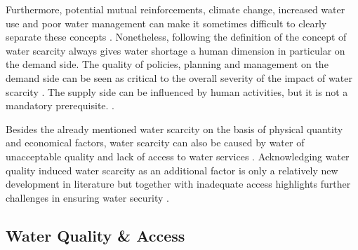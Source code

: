 Furthermore, potential mutual reinforcements, climate change, increased water use and poor water management can make it sometimes difficult to clearly separate these concepts \autocite{idmpDroughtWaterScarcity2022,lealfilhoUnderstandingResponsesClimaterelated2022,liuWaterScarcityAssessments2017,rcrcFORECASTBASEDFINANCINGEARLY2020}. Nonetheless, following the definition of \autocite{faoCopingWaterScarcity2012} the concept of water scarcity always gives water shortage a human dimension in particular on the demand side. The quality of policies, planning and management on the demand side can be seen as critical to the overall severity of the impact of water scarcity \autocite{idmpDroughtWaterScarcity2022,faoCopingWaterScarcity2012,vereintenationenSpecialReportDrought2021}. The supply side can be influenced by human activities, but it is not a mandatory prerequisite. \autocite{idmpDroughtWaterScarcity2022}. 

Besides the already mentioned water scarcity on the basis of physical quantity and economical factors, water scarcity can also be caused by water of unacceptable quality and lack of access to water services \autocite{faoCopingWaterScarcity2012}. Acknowledging water quality induced water scarcity as an additional factor is only a relatively new development in literature \autocite{liuThreedimensionalWaterScarcity2020} but together with inadequate access highlights further challenges in ensuring water security \autocite{caretta2022water, mishraWaterSecurityChanging2021}.

\subsection{Water Quality \& Access}

